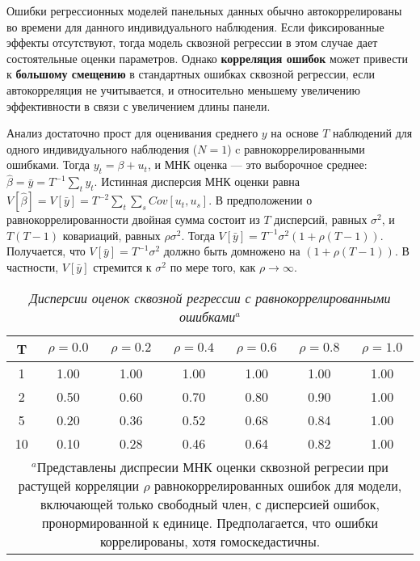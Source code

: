 Ошибки регрессионных моделей панельных данных обычно автокоррелированы во времени для данного индивидуального наблюдения. Если фиксированные эффекты отсутствуют, тогда модель сквозной регрессии в этом случае дает состоятельные оценки параметров. Однако \textbf{корреляция ошибок} может привести к \textbf{большому смещению} в стандартных ошибках сквозной регрессии, если автокорреляция не учитывается, и относительно меньшему увеличению эффективности в связи с увеличением длины панели.

Анализ достаточно прост для оценивания среднего $y$ на основе $T$ наблюдений для одного индивидуального наблюдения ($N=1$) c равнокоррелированными ошибками. Тогда $y_t=\beta + u_t$, и МНК оценка --- это выборочное среднее: $\hat{\beta}=\bar{y}=T^{-1} \sum_t y_t$. Истинная дисперсия МНК оценки равна $V[\hat{\beta}]=V[\bar{y}]=T^{-2}\sum_t \sum_s Cov[u_{t},u_{s}]$. В предположении о равнокоррелированности двойная сумма состоит из $T$ дисперсий, равных $\sigma^2$, и $T(T-1)$ ковариаций, равных $\rho \sigma^2$. Тогда $V[\bar{y}]=T^{-1}\sigma^2(1+\rho (T-1))$. Получается, что $V[\bar{y}]=T^{-1}\sigma^2$ должно быть домножено на $(1+\rho (T-1))$. В частности, $V[\bar{y}]$ стремится к $\sigma^2$ по мере того, как $\rho \rightarrow \infty$.

\begin{table}[ht]
\caption{{\it Дисперсии оценок сквозной регрессии с равнокоррелированными ошибками$^a$}} 
\centering
\begin{tabular}{ccccccc}
\hline \hline
	\textbf{T} & $\rho=\mathbf{0.0}$& $\rho=\mathbf{0.2}$	& $\rho=\mathbf{0.4}$	& $\rho=\mathbf{0.6}$	& $\rho=\mathbf{0.8}$	& $\rho=\mathbf{1.0}$ \\
\hline
1	&1.00	&1.00	&1.00	&1.00	&1.00	&1.00\\
2	&0.50	&0.60	&0.70	&0.80	&0.90	&1.00\\
5	&0.20	&0.36	&0.52	&0.68	&0.84	&1.00\\
10	&0.10	&0.28	&0.46	&0.64	&0.82	&1.00\\
\hline \hline
\multicolumn{7}{p{14cm}}{$^a$Представлены диспресии МНК оценки сквозной регресии при растущей корреляции $\rho$ равнокоррелированных ошибок для модели, включающей только свободный член, с дисперсией ошибок, пронормированной к единице. Предполагается, что ошибки коррелированы, хотя гомоскедастичны.} \\
\end{tabular}
\label{Tab:21.6}
\end{table}

